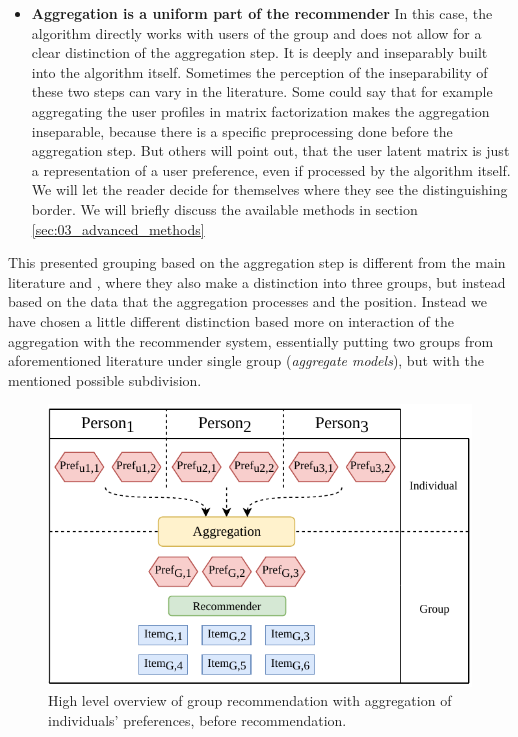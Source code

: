 \begin{itemize}
    \item \textbf{Aggregation is a uniform part of the recommender} \newline
    In this case, the algorithm directly works with users of the group and does not allow for a clear distinction of the aggregation step. It is deeply and inseparably built into the algorithm itself. Sometimes the perception of the inseparability of these two steps can vary in the literature. Some could say that for example aggregating the user profiles in matrix factorization makes the aggregation inseparable, because there is a specific preprocessing done before the aggregation step. But others will point out, that the user latent matrix is just a representation of a user preference, even if processed by the algorithm itself. We will let the reader decide for themselves where they see the distinguishing border. We will briefly discuss the available methods in section \ref{sec:03_advanced_methods}
\end{itemize}


This presented grouping based on the aggregation step is different from the main literature  \cite{recommendations_to_groups-jameson2007} and \cite{grouprecommendersystems_felfernig2018group}, where they also make a distinction into three groups, but instead based on the data that the aggregation processes and the position. Instead we have chosen a little different distinction based more on interaction of the aggregation with the recommender system, essentially putting two groups from aforementioned literature under single group (\textit{aggregate models}), but with the mentioned possible subdivision.
    

\begin{figure}[htbp]
    \centering
    \includegraphics{img/before-rec-aggregation.pdf}
    \caption{High level overview of group recommendation with aggregation of individuals' preferences, before recommendation.}
    \label{fig:before_rec_agg}
\end{figure}

